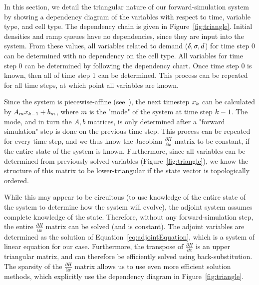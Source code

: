 

In this section, we detail the triangular nature of our forward-simulation system by showing a dependency diagram of the variables with respect to time, variable type, and cell type. The dependency chain is given in Figure~\ref{fig:triangle}. Initial densities and ramp queues have no dependencies, since they are input into the system. From these values, all variables related to demand ($\delta,\sigma,d$) for time step 0 can be determined with no dependency on the cell type. All variables for time step 0 can be determined by following the dependency chart. Once time step 0 is known, then all of time step 1 can be determined. This process can be repeated for all time steps, at which point all variables are known.

Since the system is piecewise-affine (see~\cite{Thai}), the next timestep $x_{k}$ can be calculated by $A_m x_{k - 1} + b_m$, where $m$ is the "mode" of the system at time step $k - 1$. The mode, and in turn the $A,b$ matrices, is only determined after a "forward simulation" step is done on the previous time step. This process can be repeated for every time step, and we thus know the Jacobian $\frac{\partial H}{\partial x}$ matrix to be constant, if the entire state of the system is known. Furthermore, since all variables can be determined from previously solved variables (Figure~\ref{fig:triangle}), we know the structure of this matrix to be lower-triangular if the state vector is topologically ordered.

While this may appear to be circuitous (to use knowledge of the entire state of the system to determine how the system will evolve), the adjoint system assumes complete knowledge of the state. Therefore, without any forward-simulation step, the entire $\frac{\partial H}{\partial x}$ matrix can be solved (and is constant). The adjoint variables are determined as the solution of Equation~\ref{eq:adjointEquation}, which is a system of linear equation for our case. Furthermore, the transpose of $\frac{\partial H}{\partial x}$ is an upper triangular matrix, and can therefore be efficiently solved using back-substitution. The sparsity of the $\frac{\partial H}{\partial x}$ matrix allows us to use even more efficient solution methods, which explicitly use the dependency diagram in Figure~\ref{fig:triangle}.